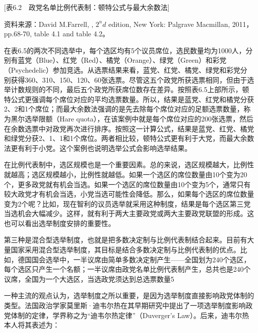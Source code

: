 [表6.2　政党名单比例代表制：顿特公式与最大余数法]

资料来源：David M.Farrell, , $2^nd$ edition, New York: Palgrave Macmillan, 2011，pp.68-70, table 4.1 and table 4.2。

在表6.5的两次不同选举中，每个选区均有5个议员席位，选民数量均为1000人，分别有蓝党（Blue）、红党（Red）、橘党（Orange）、绿党（Green）和彩党（Psychedelic）参加竞选。从选票结果来看，蓝党、红党、橘党、绿党和彩党分别获得360、310、150、120、60张选票。尽管这五个政党所获选票相同，但由于选举计数规则的不同，最后五个政党所获席位数存在差异。按照表6.5上部所示，顿特公式更强调每个席位对应的平均选票数量。所以，结果是蓝党、红党和橘党分获2、2和1个席位；而最大余数法强调的是先去除每个席位对应的足额选票数量，称为黑尔选举限额（Hare quota），在该案例中就是每个席位对应的200张选票，然后在余数选票中对政党再次进行排序。按照这一计算公式，结果是蓝党、红党、橘党和绿党分获2、1、1和1个席位。两者相比较，顿特公式更有利于大党，而最大余数法更有利于小党。这个案例也说明选举公式会影响选举结果。

在比例代表制中，选区规模也是一个重要因素。总的来说，选区规模越大，比例性就越高；选区规模越小，比例性就越低。如果一个选区的席位数量由10个变为20个，更多政党就有机会当选。如果一个选区的席位数量由10个变为5个，通常只有较大政党才有机会当选，小党当选可能性会降低。那么，如果每个选区的席位数量变为2个呢？比如，现在智利的议员选举就采用这种制度，结果是每个选区第三党当选机会大幅减少。这样，就有利于两大主要政党或两大主要政党联盟的形成。这也可以看出选举制度安排的重要性。

第三种是混合型选举制度，也就是把多数决定制与比例代表制结合起来。目前有大量国家采用混合型选举制度，其目标是结合多数决定制与比例代表制的优点。比如，德国国会选举中，一半议席由简单多数决定制产生——全国划为240个选区，每个选区只产生一个名额；一半议席由政党名单比例代表制产生，总共也是240个议席，全国为一个大选区，当选政党须达到总选票数量5%

一种主流的观点认为，选举制度之所以重要，是因为选举制度直接影响政党体制的类型。法国政治学家莫里斯·迪韦尔热在其早期研究中提出了一项选举制度影响政党体制的定律，学界称之为“迪韦尔热定律”（Duverger's Law）。后来，迪韦尔热本人将其表述为：



